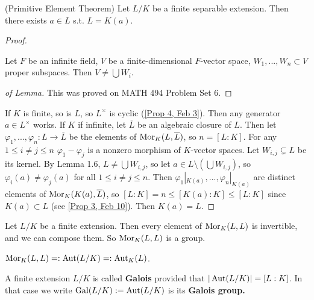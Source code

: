\begin{prop} \label{Prop 5, Feb 13}
	(Primitive Element Theorem) Let $L/K$ be a finite separable extension. Then there exists $a \in L$ s.t. $L = K(a)$.
\end{prop}

\begin{proof}
	\begin{lemma}
		Let $F$ be an infinite field, $V$ be a finite-dimensional $F$-vector space, $W_1, ..., W_n \subset V$ proper subspaces. Then $V \neq \bigcup W_i$.
	\end{lemma}
	\begin{proof}[of Lemma]
		This was proved on MATH 494 Problem Set 6.
	\end{proof}
	If $K$ is finite, so is $L$, so $L^{\times}$ is cyclic (\ref{Prop 4, Feb 3}). Then any generator $a \in L^{\times}$ works. If $K$ if infinite, let $\overline{L}$ be an algebraic closure of $L$. Then let $\varphi_1, ..., \varphi_n : L \rightarrow \overline{L}$ be the elements of $\operatorname{Mor}_K(L, \overline{L})$, so $n = [L : K]$. For any $1 \leq i \neq j \leq n$ $\varphi_1 - \varphi_j$ is a nonzero morphism of $K$-vector spaces. Let $W_{i, j} \subsetneq L$ be its kernel. By Lemma 1.6, $L \neq \bigcup W_{i, j}$, so let $a \in L \setminus \left( \bigcup W_{i, j} \right)$, so $\varphi_i(a) \neq \varphi_j(a)$ for all $1 \leq i \neq j \leq n$. Then $\varphi_1|_{K(a)}, ..., \varphi_n|_{K(a)}$ are distinct elements of $\operatorname{Mor}_K(K(a), \overline{L})$, so $[L : K] = n \leq [K(a) : K] \leq [L : K]$ since $K(a) \subset L$ (see \ref{Prop 3, Feb 10}). Then $K(a) = L$.
\end{proof}

\begin{rmk}
	Let $L/K$ be a finite extension. Then every element of $\operatorname{Mor}_K(L, L)$ is invertible, and we can compose them. So $\operatorname{Mor}_K(L,L)$ is a group.
\end{rmk}

\begin{defn} \label{Defn 6, Feb 13}
	$\operatorname{Mor}_K(L,L) =: \operatorname{Aut}(L/K) =: \operatorname{Aut}_K(L)$.
\end{defn}

\begin{defn} \label{Defn 7, Feb 13}
	A finite extension $L/K$ is called \textbf{Galois} provided that $|\operatorname{Aut}(L/K)| = [L : K]$. In that case we write $\operatorname{Gal}(L/K) := \operatorname{Aut}(L/K)$ is its \textbf{Galois group.}
\end{defn}
